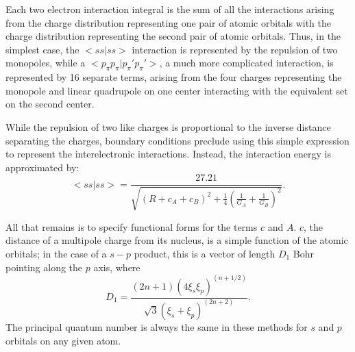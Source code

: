 Each two electron interaction integral is the sum of all the interactions
arising from the charge distribution representing one pair of atomic orbitals
with the charge distribution representing the second pair of atomic orbitals.
Thus, in the simplest case, the $<ss|ss>$ interaction is represented by the
repulsion of two monopoles, while a $ <p_{\pi} p_{\pi} |p_{\pi} 'p_{\pi} '>$, a
much more complicated interaction, is represented by 16 separate terms, arising
from the four charges representing the monopole and linear quadrupole on one
center interacting with the equivalent set on the second center.

 While the repulsion of two like charges is proportional
to the inverse distance separating the charges, boundary
conditions preclude using this simple expression to
represent the interelectronic interactions. Instead, the
interaction energy is approximated by:
$$
<ss|ss> =\frac{27.21}{\sqrt{(R+c_A+c_B)^2+\frac{1}{4}
(\frac{1}{G_A}+\frac{1}{G_B})^2}}.
$$

All that remains is to specify functional forms for the
terms $c$ and $A$. $c$, the distance of a multipole charge from
its nucleus, is a simple function of the atomic orbitals; in
the case of a $s-p$ product, this is a vector of length $D_1$
Bohr pointing along the $p$ axis, where
$$
D_1 = \frac{(2n+1)(4\xi_s\xi_p)^{(n+1/2)}}{\sqrt{3}(\xi_s+\xi_p)^{(2n+2)}}.
$$
The principal quantum number is always the
same in these methods for $s$ and $p$ orbitals on any given
atom.

